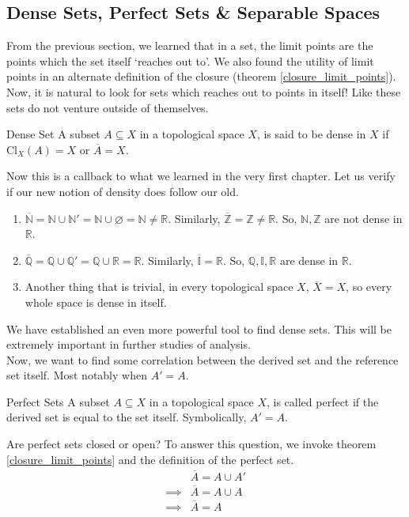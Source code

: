 \subsection{Dense Sets, Perfect Sets \& Separable Spaces}
From the previous section, we learned that in a set, the limit points are the points which the set itself `reaches out to'. We also found the utility of limit points in an alternate definition of the closure (theorem \eqref{closure_limit_points}). Now, it is natural to look for sets which reaches out to points in itself! Like these sets do not venture outside of themselves.
\begin{Definition}{Dense Set}\label{dense_set}
    A subset $A\subseteq X$ in a topological space $X$, is said to be dense in $X$ if $\mathrm{Cl}_X(A)=X$ or $\overline{A}=X$.
\end{Definition}
\noindent Now this is a callback to what we learned in the very first chapter. Let us verify if our new notion of density does follow our old.\\
\begin{enumerate}
    \item $\overline{\mathbb{N}}=\mathbb{N}\cup\mathbb{N}'=\mathbb{N}\cup\varnothing=\mathbb{N}\neq\mathbb{R}$. Similarly, $\overline{\mathbb{Z}}=\mathbb{Z}\neq\mathbb{R}$. So, $\mathbb{N, Z}$ are not dense in $\mathbb{R}$.
    \item $\overline{\mathbb{Q}}=\mathbb{Q}\cup\mathbb{Q}'=\mathbb{Q}\cup\mathbb{R}=\mathbb{R}$. Similarly, $\overline{\mathbb{I}}=\mathbb{R}$. So, $\mathbb{Q, I, R}$ are dense in $\mathbb{R}$.
    \item Another thing that is trivial, in every topological space $X$, $\overline{X}=X$, so every whole space is dense in itself.
\end{enumerate}
We have established an even more powerful tool to find dense sets. This will be extremely important in further studies of analysis.\\
Now, we want to find some correlation between the derived set and the reference set itself. Most notably when $A'=A$.
\begin{Definition}{Perfect Sets}\label{perfect_set}
    A subset $A\subseteq X$ in a topological space $X$, is called perfect if the derived set is equal to the set itself. Symbolically, $A'=A$.
\end{Definition}
\noindent Are perfect sets closed or open? To answer this question, we invoke theorem \eqref{closure_limit_points} and the definition of the perfect set.
\begin{align*}
    &\overline{A}=A\cup A'\\
    \implies&\overline{A}=A\cup A\\
    \implies&\overline{A}=A
\end{align*}
